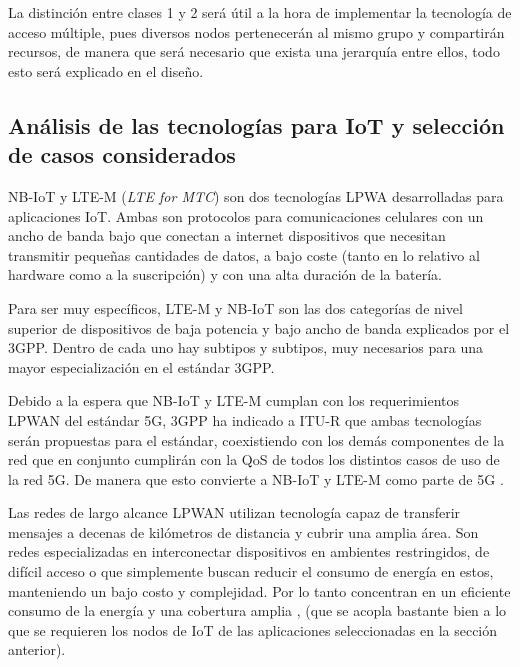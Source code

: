La distinción entre clases 1 y 2 será útil a la hora de implementar la tecnología de acceso múltiple, pues diversos nodos pertenecerán al mismo grupo y compartirán recursos, de manera que será necesario que exista una jerarquía entre ellos, todo esto será explicado en el diseño.

\subsection{Análisis de las tecnologías para IoT y selección de casos considerados}

NB-IoT y LTE-M (\textit{LTE for MTC}) son dos tecnologías LPWA desarrolladas para aplicaciones IoT. Ambas son protocolos para comunicaciones celulares con un ancho de banda bajo que conectan a internet dispositivos que necesitan transmitir pequeñas cantidades de datos, a bajo coste (tanto en lo relativo al hardware como a la suscripción) y con una alta duración de la batería.\newline

Para ser muy específicos, LTE-M y NB-IoT son las dos categorías de nivel superior de dispositivos de baja potencia y bajo ancho de banda explicados por el 3GPP. Dentro de cada uno hay subtipos y subtipos, muy necesarios para una mayor especialización en el estándar 3GPP. \newline

Debido a la espera que NB-IoT y LTE-M cumplan con los requerimientos LPWAN del estándar 5G, 3GPP ha indicado a ITU-R que ambas tecnologías serán propuestas para el estándar, coexistiendo con los demás componentes de la red que en conjunto cumplirán con la QoS de todos los distintos casos de uso de la red 5G. De manera que esto convierte a NB-IoT y LTE-M como parte de 5G \parencite{EricssonAB2016}. \newline

Las redes de largo alcance LPWAN utilizan tecnología capaz de transferir mensajes a decenas de kilómetros de distancia y cubrir una amplia área. Son redes especializadas en interconectar dispositivos en ambientes restringidos, de difícil acceso o que simplemente buscan reducir el consumo de energía en estos, manteniendo un bajo costo y complejidad. Por lo tanto concentran en un eficiente consumo de la energía y una cobertura amplia \parencite{NetTrafficIoT}, (que se acopla bastante bien a lo que se requieren los nodos de IoT de las aplicaciones seleccionadas en la sección anterior). \newline

